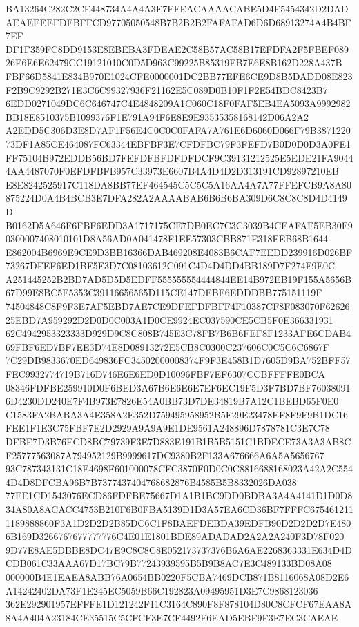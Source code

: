 \documentclass[UTF8,fontset=fandol,zihao=-4,a4paper]{ctexart}
\begin{document}
{{BA13264C282C2CE448734A4A4A3E7FFEACAAAACABE5D4E5454342D2DADAEAEEEEFDFBFFCD97705050548B7B2B2B2FAFAFAD6D6D68913274A4B4BF7EF
DF1F359FC8DD9153E8EBEBA3FDEAE2C58B57AC58B17EFDFA2F5FBEF08926E6E6E62479CC19121010C0D5D963C99225B85319FB7E6E8B162D228A437B
FBF66D5841E834B970E1024CFE0000001DC2BB77EFE6CE9D8B5DADD08E823F2B9C9292B271E3C6C99327936F21162E5C089D0B10F1F2E54BDC8423B7
6EDD0271049DC6C646747C4E4848209A1C060C18F0FAF5EB4EA5093A9992982BB18E8510375B1099376F1E791A94F6E8E9E93535358168142D06A2A2
A2EDD5C306D3E8D7AF1F56E4C0C0C0FAFA7A761E6D6060D066F79B387122073DF1A85CE464087FC63344EBFBF3E7CFDFBC79F3FEFD7B0D0D0D3A0FE1
FF75104B972EDDB56BD7FEFDFBFDFDFDCF9C39131212525E5EDE21FA90444AA4487070F0EFDFBFB957C33973E6607B4A4D4D2D313191CD92897210EB
E8E8242525917C118DA8BB77EF464545C5C5C5A16AA4A7A77FFEFCB9A8A80875224D0A4B4BCB3E7DFA282A2AAAABAB6B6B6BA309D6C8C8C8D4D4149D
B0162D5A646F6FBF6EDD3A1717175CE7DB0EC7C3C3039B4CEAFAF5EB30F90300007408010101D8A56AD0A041478F1EE57303CBB871E318FEB68B1644
E862004B6969E9CE9D3BB16366DAB469208E4083B6CAF7EEDD239916D026BF73267DFEF6ED1BF5F3D7C08103612C091C4D4D4DD4BB189D7F274F9E0C
A251445252B2BD7AD5D5D5EDFF555555554444844EE14B972EB19F155A5656B67D99E8BC5F5353C39116656565D115CE147DFBF6EDDDBB775151119F
74504848C8F9F3E7AF5EBD7AE7CE9DFEFDFBFF4F10387CF8F083070F6262625EBD7A959292D2D0D0C003A1D0CE9924EC037590CE5CB5F0E366331931
62C4942953323333D929D9C8C808B745E3C78FB7B6B6FEF8F1233AFE6CDAB469FBF6ED7BF7EE3D74E8D08913272E5CB8C0300C237606C0C5C6C6867F
7C29DB9833670ED649836FC34502000008374F9F3E458B1D7605D9BA752BFF57FEC9932774719B716D746E6E6ED0D10096FBF7EF6307CCBFFFFE0BCA
08346FDFBE259910D0F6BED3A67B6E6E6E7EF6EC19F5D3F7BD7BF760380916D4230DD240E7F4B973E7826E54A0BB73D7DE34819B7A12C1BEBD65F0E0
C1583FA2BABA3A4E358A2E352D759495958952B5F29E23478EF8F9F9B1DC16FEE1F1E3C75FBF7E2D2929A9A9A9E1DE9561A248896D7878781C3E7C78
DFBE7D3B76ECD8BC79739F3E7D883E191B1B5B5151C1BDECE73A3A3AB8CF25777563087A794952129B9999617DC9380B2F133A676666A6A5A5656767
93C787343131C18E4698F601000078CFC3870F0D0C0C8816688168023A42A2C5544D4D8DFCBA96B7B7377437404768682876B4585B5B8332026DA038
77EE1CD1543076ECD86FDFBE75667D1A1B1BC9DD0BDBA3A4A4141D1D0D834A80A8ACACC4753B210F6B0FBA5139D1D3A57EA6CD36BF7FFFC675461211
1189888860F3A1D2D2D2B85DC6C1F8BAEFDEBDA39EDFB90D2D2D2D7E4806B169D3266767677777776C4E01E1801BDE89ADADAD2A2A2A240F3D78F020
9D77E8AE5DBBE8DC47E9C8C8C8E052173737376B6A6AE2268363331E634D4DCDB061C33AAA67D17BC79B77243939595B5B9B8AC7E3C489133BD08A08
000000B4E1EAEA8ABB76A0654BB0220F5CBA7469DCB871B8116068A08D2E6A14242402DA73F1E245EC5059B66C192823A09495951D3E7C9868123036
362E292901957EFFFE1D121242F11C3164C890F8F878104D80C8CFCF67EAA8A8A4A404A23184CE35515C5CFCF3E7CF4492F6EAD5EBF9F3E7EC3CAEAE
}}
\end{document}
